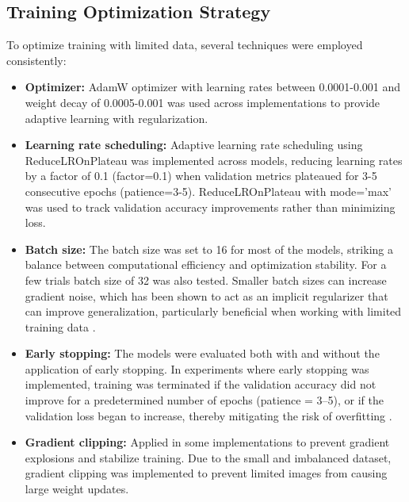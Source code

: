 \documentclass[a4paper,12pt]{report}
\begin{document}

\subsection{Training Optimization Strategy}

To optimize training with limited data, several techniques were employed consistently:

\begin{itemize}
    \item \textbf{Optimizer:} AdamW optimizer with learning rates between 0.0001-0.001 and weight decay of 0.0005-0.001 was used across implementations to provide adaptive learning with regularization.
    
    \item \textbf{Learning rate scheduling:} Adaptive learning rate scheduling using ReduceLROnPlateau was implemented across models, reducing learning rates by a factor of 0.1 (factor=0.1) when validation metrics plateaued for 3-5 consecutive epochs (patience=3-5). ReduceLROnPlateau with mode='max' was used to track validation accuracy improvements rather than minimizing loss.
    
    \item \textbf{Batch size:} The batch size was set to 16 for most of the models, striking a balance between computational efficiency and optimization stability. For a few trials batch size of 32 was also tested. Smaller batch sizes can increase gradient noise, which has been shown to act as an implicit regularizer that can improve generalization, particularly beneficial when working with limited training data \citep{keskar2016largebatch, masters2018revisiting}.
    
    \item \textbf{Early stopping:} The models were evaluated both with and without the application of early stopping. In experiments where early stopping was implemented, training was terminated if the validation accuracy did not improve for a predetermined number of epochs (patience = 3–5), or if the validation loss began to increase, thereby mitigating the risk of overfitting \citep{Prechelt1998}.

    \item \textbf{Gradient clipping:} Applied in some implementations to prevent gradient explosions and stabilize training. Due to the small and imbalanced dataset, gradient clipping was implemented to prevent limited images from causing large weight updates. 
    

\end{itemize}
\end{document}
